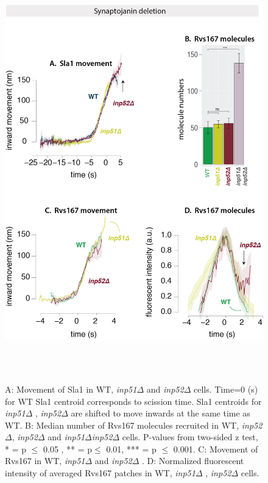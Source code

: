 \vspace{3mm}
		\begin{figure}[H]
	\centering
	\includegraphics[width=18cm,height=18cm,keepaspectratio]{figures/results_final/inp_movement3}
	\caption[Effect of synaptojanin deletion]
{A: Movement of Sla1 in WT, \textit{inp51$\Delta$ }  and \textit{inp52$\Delta$ } cells. Time=0 (s) for WT Sla1 centroid corresponds to scission time. Sla1 centroids for \textit{inp51$\Delta$ }, \textit{inp52$\Delta$ }  are shifted to move inwards at the same time as WT. 
		B: Median number of Rvs167 molecules recruited in WT, \textit{inp52$\Delta$}, \textit{inp52$\Delta$ } and \textit{inp51$\Delta$inp52$\Delta$ } cells. P-values from two-sided z test,  * = p $\leq$ 0.05 , ** = p$\leq$ 0.01, *** = p $\leq$ 0.001.  
		C: Movement of Rvs167 in WT, \textit{inp51$\Delta$ } and \textit{inp52$\Delta$ }. 
		D: Normalized fluorescent intensity of averaged Rvs167 patches in WT, \textit{inp51$\Delta$ }, \textit{inp52$\Delta$ } cells.
		\label{fig_inpmov}}
\end{figure}


